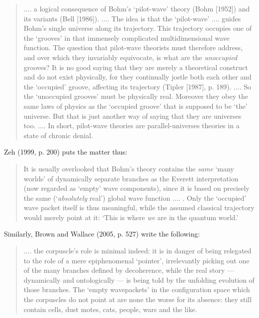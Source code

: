 \documentclass{article}%
\begin{document}
\begin{quote}
.... a logical consequence of Bohm's `pilot-wave' theory (Bohm [1952]) and its
variants (Bell [1986]). .... The idea is that the `pilot-wave' .... guides
Bohm's single universe along its trajectory. This trajectory occupies one of
the `grooves' in that immensely complicated multidimensional wave function.
The question that pilot-wave theorists must therefore address, and over which
they invariably equivocate, is what are the \textit{unoccupied} grooves? It is
no good saying that they are merely a theoretical construct and do not exist
physically, for they continually jostle both each other and the `occupied'
groove, affecting its trajectory (Tipler [1987], p. 189). .... So the
`unoccupied grooves' must be physically real. Moreover they obey the same laws
of physics as the `occupied groove' that is supposed to be `the' universe. But
that is just another way of saying that they are universes too. .... In short,
pilot-wave theories are parallel-universes theories in a state of chronic denial.
\end{quote}

Zeh (1999, p. 200) puts the matter thus:

\begin{quote}
It is usually overlooked that Bohm's theory contains the \textit{same} `many
worlds' of dynamically separate branches as the Everett interpretation (now
regarded as `empty' wave components), since it is based on precisely the same
(`\textit{absolutely} real') global wave function .... . Only the `occupied'
wave packet itself is thus meaningful, while the assumed classical trajectory
would merely point at it: `This is where \textit{we} are in the quantum world.'
\end{quote}

Similarly, Brown and Wallace (2005, p. 527) write the following:

\begin{quote}
.... the corpuscle's role is minimal indeed: it is in danger of being
relegated to the role of a mere epiphenomenal `pointer', irrelevantly picking
out one of the many branches defined by decoherence, while the real story ---
dynamically and ontologically --- is being told by the unfolding evolution of
those branches. The `empty wavepackets' in the configuration space which the
corpuscles do not point at are none the worse for its absence: they still
contain cells, dust motes, cats, people, wars and the like.
\end{quote}
\end{document}
